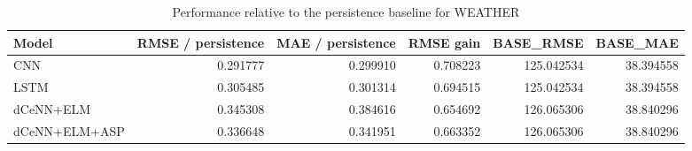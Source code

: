 \begin{table}
\caption{Performance relative to the persistence baseline for WEATHER}
\begin{tabular}{lrrrrr}
\toprule
Model & RMSE / persistence & MAE / persistence & RMSE gain & BASE\_RMSE & BASE\_MAE \\
\midrule
CNN & 0.291777 & 0.299910 & 0.708223 & 125.042534 & 38.394558 \\
LSTM & 0.305485 & 0.301314 & 0.694515 & 125.042534 & 38.394558 \\
dCeNN+ELM & 0.345308 & 0.384616 & 0.654692 & 126.065306 & 38.840296 \\
dCeNN+ELM+ASP & 0.336648 & 0.341951 & 0.663352 & 126.065306 & 38.840296 \\
\bottomrule
\end{tabular}
\end{table}
